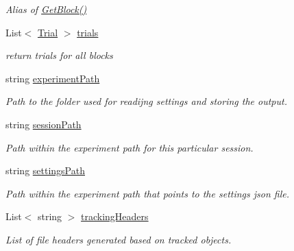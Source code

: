 \begin{DoxyCompactItemize}
\begin{DoxyCompactList}\small\item\em Alias of \hyperlink{class_exp_mngr_1_1_experiment_session_a891451cca778e4f355959cf921af138c}{Get\+Block()} \end{DoxyCompactList}\item 
List$<$ \hyperlink{class_exp_mngr_1_1_trial}{Trial} $>$ \hyperlink{class_exp_mngr_1_1_experiment_session_a3fb8d4620a18f17723fc3308a4b5e249}{trials}
\begin{DoxyCompactList}\small\item\em return trials for all blocks \end{DoxyCompactList}\item 
string \hyperlink{class_exp_mngr_1_1_experiment_session_a1bae768ffa935c56e5e38442ca590470}{experiment\+Path}
\begin{DoxyCompactList}\small\item\em Path to the folder used for readijng settings and storing the output. \end{DoxyCompactList}\item 
string \hyperlink{class_exp_mngr_1_1_experiment_session_a384903177a4f3b7eeaeea4c85516ce40}{session\+Path}
\begin{DoxyCompactList}\small\item\em Path within the experiment path for this particular session. \end{DoxyCompactList}\item 
string \hyperlink{class_exp_mngr_1_1_experiment_session_abd5621f8030a4d4d265521ac2667317e}{settings\+Path}
\begin{DoxyCompactList}\small\item\em Path within the experiment path that points to the settings json file. \end{DoxyCompactList}\item 
List$<$ string $>$ \hyperlink{class_exp_mngr_1_1_experiment_session_a38d95075e3c49ebdb5565a6024ad925b}{tracking\+Headers}
\begin{DoxyCompactList}\small\item\em List of file headers generated based on tracked objects. \end{DoxyCompactList}\end{DoxyCompactItemize}


